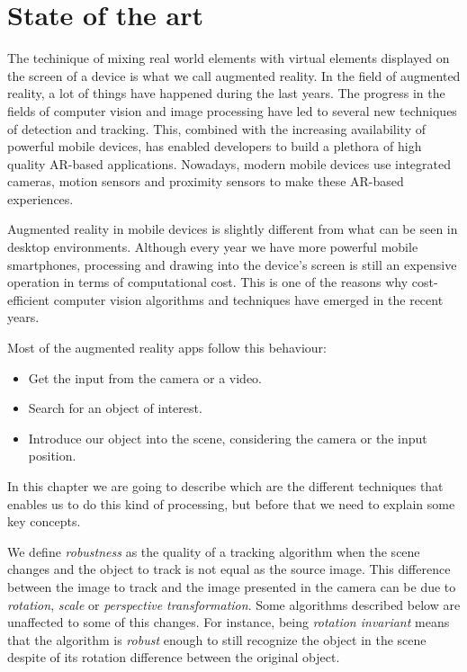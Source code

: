 \chapter{State of the art}
\label{chap:sota}
The techinique of
mixing real world elements with virtual elements displayed on the screen of a
device is what we call augmented reality. In the field of augmented reality, a
lot of things have happened during the last years. The progress in the fields
of computer vision and image processing have led to several new techniques of
detection and tracking. This, combined with the increasing availability of
powerful mobile devices, has enabled developers to build a plethora of high
quality AR-based applications. Nowadays, modern mobile devices use integrated
cameras, motion sensors and proximity sensors to make these AR-based experiences. 

Augmented reality in mobile devices is slightly different from what can be seen in
desktop environments. Although every year we have more powerful mobile
smartphones, processing and drawing into the device's screen is still an 
expensive operation in terms of computational cost. This is one of the reasons why
cost-efficient computer vision algorithms and techniques have emerged in the recent
years. 

Most of the augmented reality apps follow this behaviour:
\begin{itemize}
\item Get the input from the camera or a video.
\item Search for an object of interest.
\item Introduce our object into the scene, considering the camera or the input position.
\end{itemize}

In this chapter we are going to describe which are the different techniques
that enables us to do this kind of processing, but before that we need to
explain some key concepts. 

We define \emph{robustness} as the quality of a tracking
algorithm when the scene changes and the object to track is not equal as the
source image. This difference between the image to track and the image
presented in the camera can be due to \emph{rotation}, \emph{scale} or
\emph{perspective transformation}. Some algorithms described below are
unaffected to some of this changes. For instance, being \emph{rotation
  invariant} means that the algorithm is \emph{robust} enough to still
recognize the object in the scene despite of its rotation difference between
the original object.

